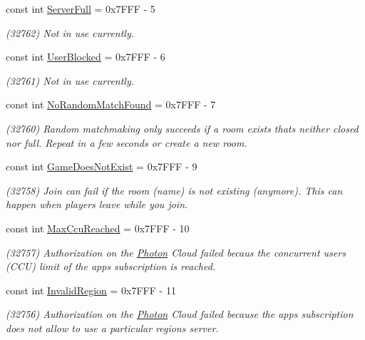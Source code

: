 \begin{DoxyCompactItemize}
\item 
const int \hyperlink{class_exit_games_1_1_client_1_1_photon_1_1_error_code_ab8516a7e5eb0152044f8befd5cc583c4}{Server\+Full} = 0x7\+F\+F\+F -\/ 5
\begin{DoxyCompactList}\small\item\em (32762) Not in use currently.\end{DoxyCompactList}\item 
const int \hyperlink{class_exit_games_1_1_client_1_1_photon_1_1_error_code_af82f564f81d5a4c27f09fe60c7854fc5}{User\+Blocked} = 0x7\+F\+F\+F -\/ 6
\begin{DoxyCompactList}\small\item\em (32761) Not in use currently.\end{DoxyCompactList}\item 
const int \hyperlink{class_exit_games_1_1_client_1_1_photon_1_1_error_code_ab72bc9e6c9cb2af830c33d613ddc2b6f}{No\+Random\+Match\+Found} = 0x7\+F\+F\+F -\/ 7
\begin{DoxyCompactList}\small\item\em (32760) Random matchmaking only succeeds if a room exists thats neither closed nor full. Repeat in a few seconds or create a new room.\end{DoxyCompactList}\item 
const int \hyperlink{class_exit_games_1_1_client_1_1_photon_1_1_error_code_a06604e183d66776a53c489908f7126e0}{Game\+Does\+Not\+Exist} = 0x7\+F\+F\+F -\/ 9
\begin{DoxyCompactList}\small\item\em (32758) Join can fail if the room (name) is not existing (anymore). This can happen when players leave while you join.\end{DoxyCompactList}\item 
const int \hyperlink{class_exit_games_1_1_client_1_1_photon_1_1_error_code_a7c5d773fe68373e9783828697d174d60}{Max\+Ccu\+Reached} = 0x7\+F\+F\+F -\/ 10
\begin{DoxyCompactList}\small\item\em (32757) Authorization on the \hyperlink{namespace_exit_games_1_1_client_1_1_photon}{Photon} Cloud failed becaus the concurrent users (C\+CU) limit of the app\textquotesingle{}s subscription is reached. \end{DoxyCompactList}\item 
const int \hyperlink{class_exit_games_1_1_client_1_1_photon_1_1_error_code_ab6f8b7f747bbd61aa8e9853c2a4194f6}{Invalid\+Region} = 0x7\+F\+F\+F -\/ 11
\begin{DoxyCompactList}\small\item\em (32756) Authorization on the \hyperlink{namespace_exit_games_1_1_client_1_1_photon}{Photon} Cloud failed because the app\textquotesingle{}s subscription does not allow to use a particular region\textquotesingle{}s server. \end{DoxyCompactList}\item 

\end{DoxyCompactItemize}
